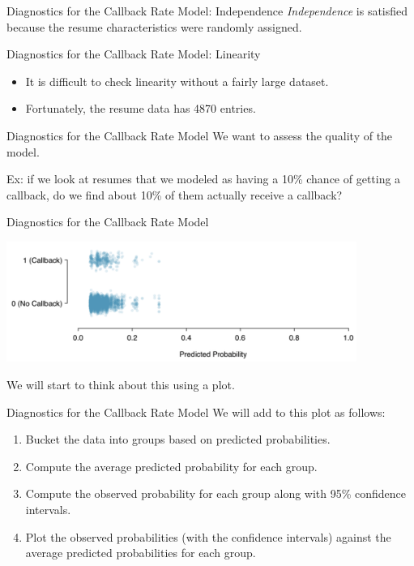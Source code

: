 \begin{frame}{Diagnostics for the Callback Rate Model: Independence}
    \textit{Independence} is satisfied because the resume characteristics were randomly assigned.
\end{frame}

\begin{frame}{Diagnostics for the Callback Rate Model: Linearity}
    \begin{itemize}
        \item It is difficult to check linearity without a fairly large dataset.
        \item Fortunately, the resume data has 4870 entries.
    \end{itemize}
\end{frame}

\begin{frame}{Diagnostics for the Callback Rate Model}
    We want to assess the quality of the model. 
    
    \vspace{12pt}Ex: if we look at resumes that we modeled as having a 10\% chance of getting a callback, do we find about 10\% of them actually receive a callback?
\end{frame}

\begin{frame}{Diagnostics for the Callback Rate Model}
    \begin{center}
        \includegraphics[width=4.5in]{images/predreallog.png}
    \end{center}
    We will start to think about this using a plot.
\end{frame}

\begin{frame}{Diagnostics for the Callback Rate Model}
    We will add to this plot as follows:
    \begin{enumerate}
        \item Bucket the data into groups based on predicted probabilities.
        \item Compute the average predicted probability for each group.
        \item Compute the observed probability for each group along with 95\% confidence intervals.
        \item Plot the observed probabilities (with the confidence intervals) against the average predicted probabilities for each group.
    \end{enumerate}
\end{frame}

